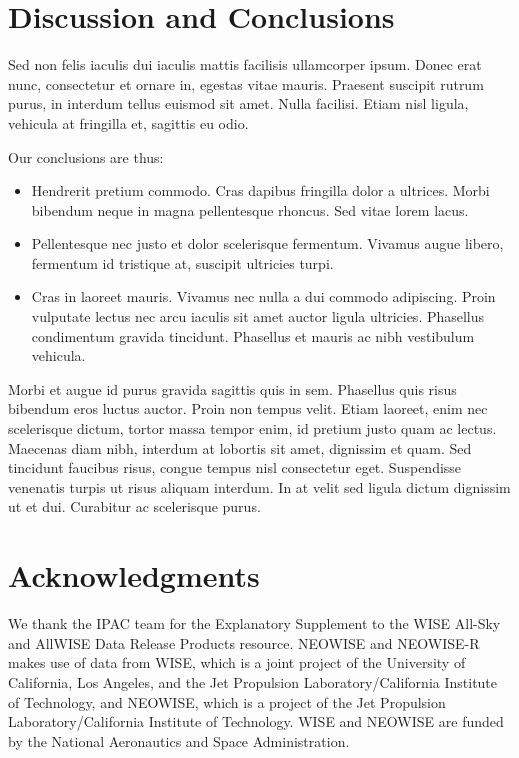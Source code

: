 \documentclass[apj]{emulateapj}
\begin{document}
\section{Discussion and Conclusions}
Sed non felis iaculis dui iaculis mattis facilisis ullamcorper
ipsum. Donec erat nunc, consectetur et ornare in, egestas vitae
mauris. Praesent suscipit rutrum purus, in interdum tellus euismod sit
amet. Nulla facilisi. Etiam nisl ligula, vehicula at fringilla et,
sagittis eu odio.

Our conclusions are thus: 
\begin{itemize}
    \item{Hendrerit pretium commodo. Cras dapibus fringilla dolor a
        ultrices. Morbi bibendum neque in magna pellentesque rhoncus. Sed
        vitae lorem lacus.}
    \item{Pellentesque nec justo et dolor scelerisque
        fermentum. Vivamus augue libero, fermentum id tristique at, suscipit
        ultricies turpi.}
    \item{Cras in laoreet mauris. Vivamus nec nulla a dui commodo
        adipiscing. Proin vulputate lectus nec arcu iaculis sit amet auctor
        ligula ultricies. Phasellus condimentum gravida tincidunt. Phasellus
        et mauris ac nibh vestibulum vehicula.}
\end{itemize}

Morbi et augue id purus gravida sagittis quis in sem. Phasellus quis
risus bibendum eros luctus auctor. Proin non tempus velit. Etiam
laoreet, enim nec scelerisque dictum, tortor massa tempor enim, id
pretium justo quam ac lectus. Maecenas diam nibh, interdum at lobortis
sit amet, dignissim et quam. Sed tincidunt faucibus risus, congue
tempus nisl consectetur eget. Suspendisse venenatis turpis ut risus
aliquam interdum. In at velit sed ligula dictum dignissim ut et
dui. Curabitur ac scelerisque purus.



\section{Acknowledgments}
We thank the IPAC team for the Explanatory Supplement to the WISE
All-Sky and AllWISE Data Release Products resource.  NEOWISE and
NEOWISE-R makes use of data from WISE, which is a joint project of the
University of California, Los Angeles, and the Jet Propulsion
Laboratory/California Institute of Technology, and NEOWISE, which is a
project of the Jet Propulsion Laboratory/California Institute of
Technology. WISE and NEOWISE are funded by the National Aeronautics
and Space Administration.
\end{document}

